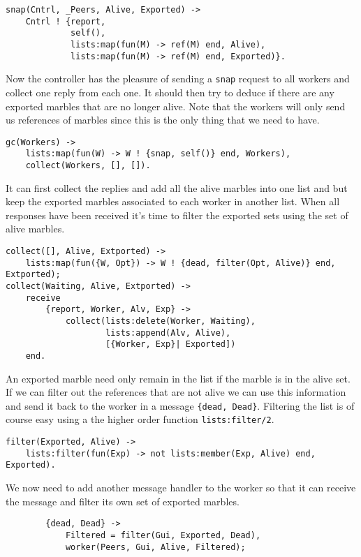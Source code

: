 \documentclass[a4paper,11pt]{article}
\begin{document}
\begin{verbatim}
snap(Cntrl, _Peers, Alive, Exported) ->
    Cntrl ! {report, 
             self(), 
             lists:map(fun(M) -> ref(M) end, Alive),
             lists:map(fun(M) -> ref(M) end, Exported)}.
\end{verbatim}

Now the controller has the pleasure of sending a {\tt snap} request to
all workers and collect one reply from each one. It should then try to
deduce if there are any exported marbles that are no longer
alive. Note that the workers will only send us references of marbles
since this is the only thing that we need to have.

\begin{verbatim}
gc(Workers) ->
    lists:map(fun(W) -> W ! {snap, self()} end, Workers),
    collect(Workers, [], []).
\end{verbatim}

It can first collect the replies and add all the alive marbles into
one list and but keep the exported marbles associated to each worker
in another list. When all responses have been received it's time to
filter the exported sets using the set of alive marbles.

\begin{verbatim}
collect([], Alive, Extported) ->
    lists:map(fun({W, Opt}) -> W ! {dead, filter(Opt, Alive)} end, Extported);
collect(Waiting, Alive, Extported) ->
    receive 
        {report, Worker, Alv, Exp} ->   
            collect(lists:delete(Worker, Waiting), 
                    lists:append(Alv, Alive),
                    [{Worker, Exp}| Exported])
    end.
\end{verbatim}

An exported marble need only remain in the list if the marble is in
the alive set.  If we can filter out the references that are not alive
we can use this information and send it back to the worker in a
message {\tt\{dead, Dead\}}. Filtering the list is of course easy
using a the higher order function {\tt lists:filter/2}.

\begin{verbatim}
filter(Exported, Alive) ->
    lists:filter(fun(Exp) -> not lists:member(Exp, Alive) end, Exported).
\end{verbatim}

We now need to add another message handler to the worker so that it
can receive the message and filter its own set of exported marbles.

\begin{verbatim}
        {dead, Dead} ->
            Filtered = filter(Gui, Exported, Dead),
            worker(Peers, Gui, Alive, Filtered);
\end{verbatim}
\end{document}
